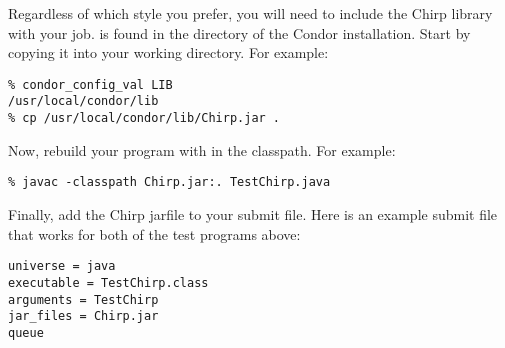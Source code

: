 Regardless of which style you prefer, you will need to
include the Chirp library with your job.
 is found in the  directory of the
Condor installation.  Start by copying it into your working
directory. For example:

\begin{verbatim}
% condor_config_val LIB
/usr/local/condor/lib
% cp /usr/local/condor/lib/Chirp.jar .
\end{verbatim}

Now, rebuild your program with  in the classpath.
For example:

\begin{verbatim}
% javac -classpath Chirp.jar:. TestChirp.java
\end{verbatim}

Finally, add the Chirp jarfile to your submit file.
Here is an example submit file that works for both
of the test programs above:

\begin{verbatim}
universe = java
executable = TestChirp.class
arguments = TestChirp
jar_files = Chirp.jar
queue
\end{verbatim}



